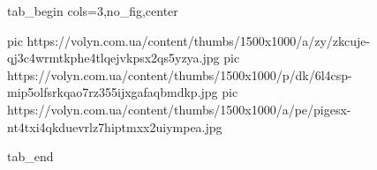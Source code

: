  
 
 
 
 


\ifcmt
  tab_begin cols=3,no_fig,center

     pic https://volyn.com.ua/content/thumbs/1500x1000/a/zy/zkcuje-qj3c4wrmtkphe4tlqejvkpsx2qs5yzya.jpg
		 pic https://volyn.com.ua/content/thumbs/1500x1000/p/dk/6l4csp-mip5olfsrkqao7rz355ijxgafaqbmdkp.jpg
		 pic https://volyn.com.ua/content/thumbs/1500x1000/a/pe/pigesx-nt4txi4qkduevrlz7hiptmxx2uiympea.jpg

  tab_end
\fi
